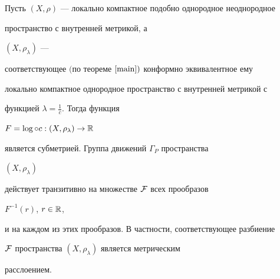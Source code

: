




\begin{thms}


\label{subh}


Пусть $(X,\rho)$ --- локально компактное подобно однородное неоднородное


пространство с внутренней метрикой, а


$(X,\rho_{\lambda})$ ---


соответствующее $($по теореме $\ref{main})$ конформно эквивалентное ему


локально компактное однородное пространство с внутренней метрикой с


функцией $\lambda = \frac{1}{c}$. Тогда функция


$F =\log \circ{c}:(X,\rho_{\lambda}) \rightarrow \Bbb{R}$


является субметрией. Группа движений $\Gamma_{P}$ пространства


$(X,\rho_{\lambda})$


действует транзитивно на множестве $\cal{F}$ всех прообразов


$F^{-1}(r)$, $r \in \Bbb{R}$,


и на каждом из этих прообразов. В частности, соответствующее разбиение


$\cal{F}$ пространства $(X,\rho_{\lambda})$ является метрическим


расслоением.


\end{thms}





